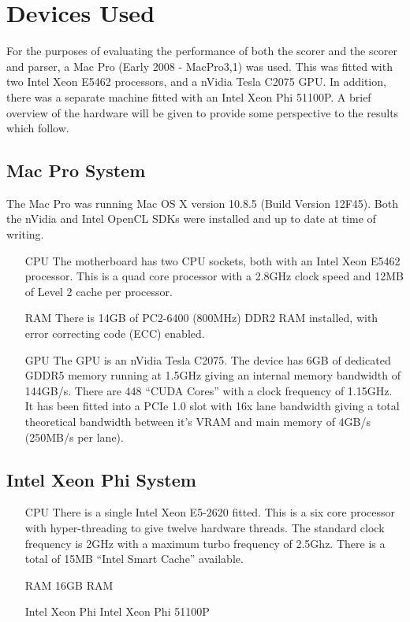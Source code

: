 \section{Devices Used}

For the purposes of evaluating the performance of both the scorer and the scorer
and parser, a Mac Pro (Early 2008 - MacPro3,1) was used. This was fitted with
two Intel Xeon E5462 processors, and a nVidia Tesla C2075 GPU. In addition,
there was a separate machine fitted with an Intel Xeon Phi 51100P. A brief
overview of the hardware will be given to provide some perspective to the
results which follow.

\subsection{Mac Pro System}

The Mac Pro was running Mac OS X version 10.8.5 (Build Version 12F45). Both the
nVidia and Intel OpenCL SDKs were installed and up to date at time of writing.

\begin{itemize}

\item[CPU] The motherboard has two CPU sockets, both with an Intel Xeon E5462
processor. This is a quad core processor with a 2.8GHz clock speed and 12MB of
Level 2 cache per processor.

\item[RAM] There is 14GB of PC2-6400 (800MHz) DDR2 RAM installed, with error
correcting code (ECC) enabled.

\item[GPU] The GPU is an nVidia Tesla C2075. The device has 6GB of dedicated
GDDR5 memory running at 1.5GHz giving an internal memory bandwidth of 144GB/s.
There are 448 ``CUDA Cores'' with a clock frequency of 1.15GHz. It has been
fitted into a PCIe 1.0 slot with 16x lane bandwidth giving a total theoretical
bandwidth between it's VRAM and main memory of 4GB/s (250MB/s per lane).

\end{itemize}

\subsection{Intel Xeon Phi System}

\begin{itemize}

\item[CPU] There is a single Intel Xeon E5-2620 fitted. This is a six core
processor with hyper-threading to give twelve hardware threads. The standard
clock frequency is 2GHz with a maximum turbo frequency of 2.5Ghz. There is a
total of 15MB ``Intel Smart Cache'' available.

\item[RAM] 16GB RAM

\item[Intel Xeon Phi] Intel Xeon Phi 51100P

\end{itemize}


